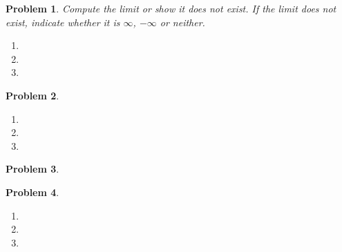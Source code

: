 \documentclass{article}
\renewcommand{\fcProblemRef}{\theproblem.\theenumi}
\newtheorem{problem}{Problem}
\begin{document}


\begin{problem}Compute the limit or show it does not exist. If the limit does not exist, indicate whether it is $\infty$, $-\infty$ or neither.
\begin{enumerate}[ref={\fcProblemRef}]
\item 
\item 
\item 
\end{enumerate}
\end{problem}




\begin{problem}
\begin{enumerate}[ref={\fcProblemRef}]
\item 
\item 
\item 

\end{enumerate}
\end{problem}




\newpage
\begin{problem}

\end{problem}


\begin{problem}~
\begin{enumerate}[ref={\fcProblemRef}]
\item 

\item 

\item 

\end{enumerate}
\end{problem}
\end{document}
